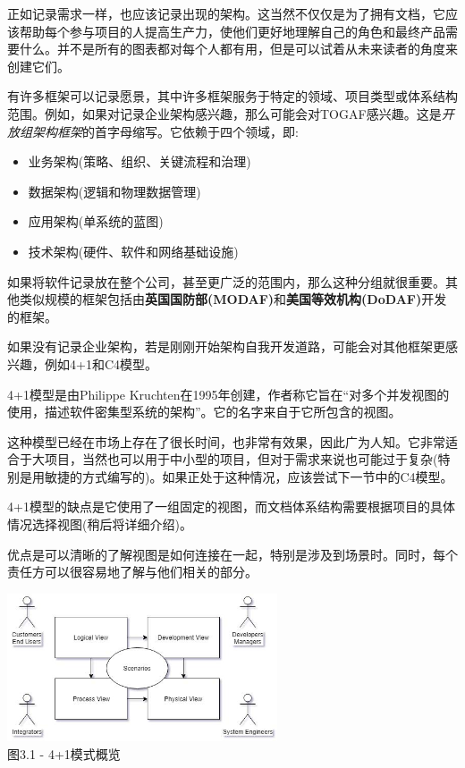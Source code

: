 
正如记录需求一样，也应该记录出现的架构。这当然不仅仅是为了拥有文档，它应该帮助每个参与项目的人提高生产力，使他们更好地理解自己的角色和最终产品需要什么。并不是所有的图表都对每个人都有用，但是可以试着从未来读者的角度来创建它们。

有许多框架可以记录愿景，其中许多框架服务于特定的领域、项目类型或体系结构范围。例如，如果对记录企业架构感兴趣，那么可能会对TOGAF感兴趣。这是\textit{开放组架构框架}的首字母缩写。它依赖于四个领域，即:

\begin{itemize}
\item 
业务架构(策略、组织、关键流程和治理)

\item 
数据架构(逻辑和物理数据管理)

\item 
应用架构(单系统的蓝图)

\item
技术架构(硬件、软件和网络基础设施)
\end{itemize}

如果将软件记录放在整个公司，甚至更广泛的范围内，那么这种分组就很重要。其他类似规模的框架包括由\textbf{英国国防部(MODAF)}和\textbf{美国等效机构(DoDAF)}开发的框架。

如果没有记录企业架构，若是刚刚开始架构自我开发道路，可能会对其他框架更感兴趣，例如4+1和C4模型。


4+1模型是由Philippe Kruchten在1995年创建，作者称它旨在“对多个并发视图的使用，描述软件密集型系统的架构”。它的名字来自于它所包含的视图。

这种模型已经在市场上存在了很长时间，也非常有效果，因此广为人知。它非常适合于大项目，当然也可以用于中小型的项目，但对于需求来说也可能过于复杂(特别是用敏捷的方式编写的)。如果正处于这种情况，应该尝试下一节中的C4模型。

4+1模型的缺点是它使用了一组固定的视图，而文档体系结构需要根据项目的具体情况选择视图(稍后将详细介绍)。

优点是可以清晰的了解视图是如何连接在一起，特别是涉及到场景时。同时，每个责任方可以很容易地了解与他们相关的部分。

\begin{center}
\includegraphics[width=0.6\textwidth]{content/1/chapter3/images/1.jpg}\\
图3.1 - 4+1模式概览
\end{center}

